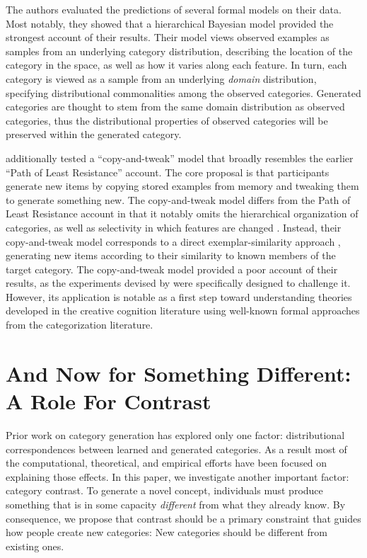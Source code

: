 \documentclass[12pt]{article}
\begin{document}
\begin{flushleft}
The authors evaluated the predictions of several formal models on their data.
Most notably, they showed that a hierarchical Bayesian model provided the
strongest account of their results. Their model views observed examples as
samples from an underlying category distribution, describing the location of the
category in the space, as well as how it varies along each feature. In turn,
each category is viewed as a sample from an underlying {\em domain}
distribution, specifying distributional commonalities among the observed
categories. Generated categories are thought to stem from the same domain
distribution as observed categories, thus the distributional properties of
observed categories will be preserved within the generated category. 

\cite{jern2013probabilistic} additionally tested a ``copy-and-tweak'' model that
broadly resembles the earlier ``Path of Least Resistance'' account. The core
proposal is that participants generate new items by copying stored examples from
memory and tweaking them to generate something new. The copy-and-tweak model
differs from the Path of Least Resistance account in that it notably omits the
hierarchical organization of categories, as well as selectivity in which
features are changed \citep[both of which are factors in the Path of Least
Resistance account;][]{ward2002role}. Instead, their copy-and-tweak model
corresponds to a direct exemplar-similarity approach
\citep[e.g.,][]{nosofsky1984choice,nosofsky1986attention}, generating new items
according to their similarity to known members of the target category. The
copy-and-tweak model provided a poor account of their results, as the
experiments devised by \citeauthor{jern2013probabilistic} were specifically
designed to challenge it. However, its application is notable as a first step
toward understanding theories developed in the creative cognition literature
using well-known formal approaches from the categorization literature.


\section{And Now for Something Different: A Role For Contrast}

Prior work on category generation has explored only one factor: distributional
correspondences between learned and generated categories. As a result most of
the computational, theoretical, and empirical efforts have been focused on
explaining those effects. In this paper, we investigate another important
factor: category contrast. To generate a novel concept, individuals must produce
something that is in some capacity {\em different} from what they already know.
By consequence, we propose that contrast should be a primary constraint that
guides how people create new categories: New categories should be different from
existing ones.


\end{flushleft}
\end{document}
